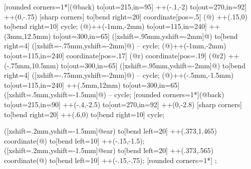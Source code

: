{\if@pingu@@horse@@donkey@
{} [rounded corners=1*\pingu@@horse@scale](@back) to[out=215,in=95] ++(-.1,-2) to[out=270,in=92] ++(0,-.75) [sharp corners] to[bend right=20] coordinate[pos=.5] (@) ++(.15,0) to[bend right=10] cycle;
\scope[rotate around={180:(@)}] %
 (@)++(-1mm,-2mm) to[out=115,in=240] ++(3mm,12.5mm) to[out=300,in=65] ([xshift=.95mm,yshift=-2mm]@) to[bend right=4] ([xshift=-.75mm,yshift=-2mm]@) -- cycle;
 (@)++(-1mm,-2mm) to[out=115,in=240] coordinate[pos=.17] (@r) coordinate[pos=.19] (@r2)  ++(-.75mm,10.5mm) to[out=300,in=65] ([xshift=.95mm,yshift=-2mm]@) to[bend right=4] ([xshift=-.75mm,yshift=-2mm]@) -- cycle;
(@)++(-.5mm,-1.5mm) to[out=115,in=240] ++(.5mm,12mm) to[out=300,in=65] ([xshift=.5mm,yshift=-1.5mm]@) -- cycle;
\endscope
\else
{} [rounded corners=1*\pingu@@horse@scale](@back) to[out=215,in=90] ++(-.4,-2.5) to[out=270,in=92] ++(0,-2.8) [sharp corners] to[bend right=20] ++(.6,0) to[bend right=10] cycle;
\fi

\if@pingu@@horse@@donkey@
{} ([xshift=.2mm,yshift=-1.5mm]@ear) to[bend left=20] ++(.373,1.465) coordinate(@) to[bend left=10] ++(-.15,-1.5);
\else
{} ([xshift=.2mm,yshift=-1.5mm]@ear) to[bend left=20] ++(.373,.565) coordinate(@) to[bend left=10] ++(-.15,-.75);
\fi
 [rounded corners=1*\pingu@@horse@scale] \pingu@@horse@@main;

}

